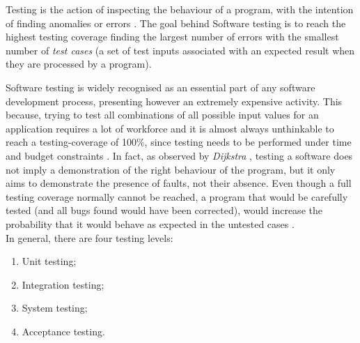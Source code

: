 Testing is the action of inspecting the behaviour of a program, with the intention of finding anomalies or errors \cite{testing}.
The goal behind Software testing is to reach the highest testing coverage finding the largest number of errors with the smallest number of \textit{test cases} (a set of test inputs associated with an expected result when they are processed by a program).

Software testing is widely recognised as an essential part of any software development process, presenting however an extremely expensive activity. This because, trying to test all combinations of all possible input values for an application \cite{glinz} requires a lot of workforce and it is almost always unthinkable to reach a testing-coverage of 100\%, since testing needs to be performed under time and budget constraints \cite{grano}. In fact, as observed by \textit{Dijkstra} \cite{dijkstra}, testing a software does not imply a demonstration of the right behaviour of the program, but it only aims to demonstrate the presence of faults, not their absence. Even though a full testing coverage normally cannot be reached, a program that would be carefully tested (and all bugs found would have been corrected), would increase the probability that it would behave as expected in the untested cases  \cite{glinz}. 
\\

In general, there are four testing levels: 
\begin{enumerate}
\item Unit testing; 
\item Integration testing; 
\item System testing; 
\item Acceptance testing.
\end{enumerate}

